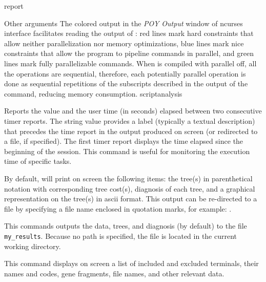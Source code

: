 \begin{command}{report}{}
\begin{arguments}
\begin{argumentgroup}{Other arguments}
{                The colored output in the \emph{POY Output} window of ncurses
                interface facilitates reading the output of :
                red lines mark hard constraints that allow neither
                parallelization nor memory optimizations, blue lines mark 
                nice constraints that allow the program to pipeline commands in
                parallel, and green lines mark fully parallelizable commands. When \poy
                is compiled with parallel off, all the operations are
                sequential, therefore, each potentially parallel operation is
                done as sequential repetitions of the subscripts described in
                the output of the command, reducing memory consumption.}
                {scriptanalysis}
                
                {Reports the value and the user time (in seconds) elapsed between
                two consecutive timer reports. The string value provides a label
                (typically a textual description) that precedes the time report
                in the output produced on screen (or redirected to a file, if specified).
                The first timer report displays the time elapsed since the beginning of the
                \poy session. This command is useful for monitoring the execution time
                of specific tasks.}
                {}

		\end{argumentgroup}
	\end{arguments}

        {By default, \poy will print on screen the following items: the tree(s)
        in parenthetical notation with corresponding tree cost(s), diagnosis of
        each tree, and a graphical representation on the tree(s) in ascii
        format. This output can be re-directed to a file by specifying a file
        name enclosed in quotation marks, for example:
        .}

	\begin{poyexamples} 

		{This commands outputs the data, trees, and diagnosis (by default) to the
		file \texttt{my\_results}. Because no path is specified, the
		file is located in the current working directory.}
		
            {This command displays on screen a list of included and excluded terminals, their
            names and codes, gene fragments, file names, and other relevant data.}
            

\end{poyexamples}
\end{command}
